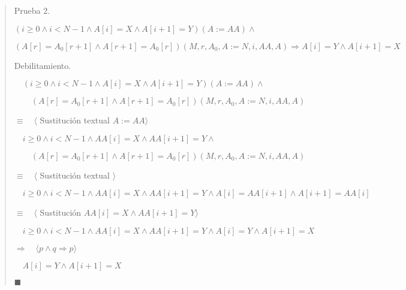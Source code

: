\documentclass[hidelinks]{article}
\newenvironment{absolutelynopagebreak}
{\Needspace{10\baselineskip}\begin{quote}}
		{\end{quote}}
\begin{document}
\begin{absolutelynopagebreak}
	Prueba 2.\par
	$(i \geq 0 \land i < N - 1 \land A[i] = X \land A[i+1] = Y)(A := AA) \land $\par
	$ (A[r] = A_0[r + 1] \land A[r + 1] = A_0[r])(M, r, A_0, A := N, i, AA, A) \Rightarrow A[i] = Y \land A[i + 1] = X$\par

	Debilitamiento.\par
	$\quad (i \geq 0 \land i < N - 1 \land A[i] = X \land A[i+1] = Y)(A := AA) \land $\par
	$\qquad (A[r] = A_0[r + 1] \land A[r + 1] = A_0[r])(M, r, A_0, A := N, i, AA, A)$\par
	$\equiv \quad \langle$ Sustitución textual $ A := AA \rangle$\par
	$\quad i \geq 0 \land i < N - 1 \land AA[i] = X \land AA[i+1] = Y \land $\par
	$\qquad (A[r] = A_0[r + 1] \land A[r + 1] = A_0[r])(M, r, A_0, A := N, i, AA, A)$\par
	$\equiv \quad \langle$ Sustitución textual $ \rangle$\par
	$\quad i \geq 0 \land i < N - 1 \land AA[i] = X \land AA[i+1] = Y \land A[i] = AA[i + 1] \land A[i + 1] = AA[i]$\par
	$\equiv \quad \langle$ Sustitución $ AA[i] = X \land AA[i+1] = Y \rangle$\par
	$\quad i \geq 0 \land i < N - 1 \land AA[i] = X \land AA[i+1] = Y \land A[i] = Y \land A[i + 1] = X$\par
	$\Rightarrow \quad \langle p \land q \Rightarrow p \rangle$\par
	$\quad A[i] = Y \land A[i + 1] = X$\par
	$\blacksquare$\par
\end{absolutelynopagebreak}
\end{document}
